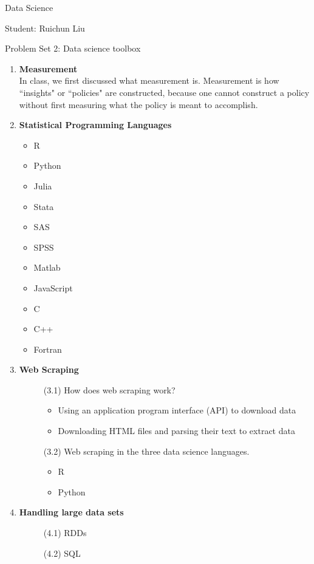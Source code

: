 \documentclass[11pt,a4paper]{article}
\begin{document}
	\begin{center}
		Data Science
		
		Student: Ruichun Liu
		
		Problem Set 2: Data science toolbox
	\end{center}
\begin{enumerate}

	\item \textbf{Measurement} \\
	In class, we first discussed what measurement is. Measurement is how ``insights" or ``policies" are constructed, because one cannot construct a policy without first measuring what the policy is meant to accomplish.
	\item \textbf{Statistical Programming Languages}
	     \begin{itemize} 
	           \item R
        	   \item Python
        	   \item Julia
        	   \item Stata
        	   \item SAS
        	   \item SPSS
        	   \item Matlab
        	   \item JavaScript
        	   \item C
        	   \item C++
        	   \item Fortran
         \end{itemize}
    \item \textbf{Web Scraping}
		  \begin{description}
	            \item[]	(3.1) How does web scraping work? 
                  	 \begin{itemize} 
	                       \item Using an application program interface (API) to download data
        	               \item Downloading HTML files and parsing their text to extract data
                     \end{itemize}      
	            \item[] (3.2) Web scraping in the three data science languages.
                  	 \begin{itemize} 
	                       \item R
        	               \item Python
                     \end{itemize}  
          \end{description}
    \item \textbf{Handling large data sets}
		  \begin{description}
	            \item[]	(4.1) RDDs
	            \item[] (4.2) SQL
          \end{description}
          

\end{enumerate}
\end{document}
